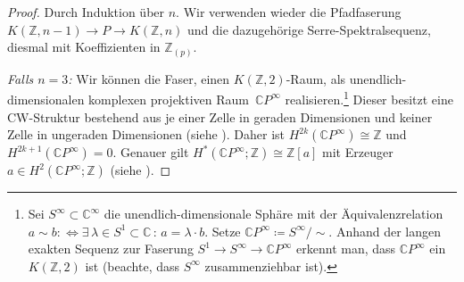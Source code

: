 \documentclass[11pt, a4paper, german]{article}
\theoremstyle{definition}
\theoremstyle{remark}
\newcommand{\Z}{\mathbb{Z}} %
\newcommand{\C}{\mathbb{C}} %
\begin{document}
\begin{proof}
  Durch Induktion über $n$.
  Wir verwenden wieder die Pfadfaserung $K(\Z, n-1) \to P \to K(\Z, n)$ und die dazugehörige Serre-Spektralsequenz, diesmal mit Koeffizienten in $\Z_{(p)}$.
  
  \emph{Falls $n = 3$:} \enspace
  Wir können die Faser, einen $K(\Z, 2)$-Raum, als unendlich-dimensionalen komplexen projektiven Raum~$\C P^\infty$ realisieren.\footnote{
    Sei $S^\infty \subset \C^\infty$ die unendlich-dimensionale Sphäre mit der Äquivalenzrelation $a \sim b :\!\iff \exists \, \lambda \in S^1 \subset \C \,:\, a = \lambda \cdot b$. Setze $\C P^\infty \coloneqq S^\infty / {\sim}$.
    Anhand der langen exakten Sequenz zur Faserung $S^1 \to S^\infty \to \C P^\infty$ erkennt man, dass $\C P^\infty$ ein $K(\Z, 2)$ ist (beachte, dass $S^\infty$ zusammenziehbar ist).
  }
  Dieser besitzt eine CW-Struktur bestehend aus je einer Zelle in geraden Dimensionen und keiner Zelle in ungeraden Dimensionen (siehe \cite[Bsp 0.6]{hatcher:at}).
  Daher ist $H^{2k}(\C P^\infty) \cong \Z$ und $H^{2k+1}(\C P^\infty) = 0$.
  Genauer gilt $H^*(\C P^\infty; \Z) \cong \Z[a]$ mit Erzeuger $a \in H^2(\C P^\infty; \Z)$ (siehe \cite[Thm 3.12]{hatcher:at}).


\end{proof}
\end{document}
